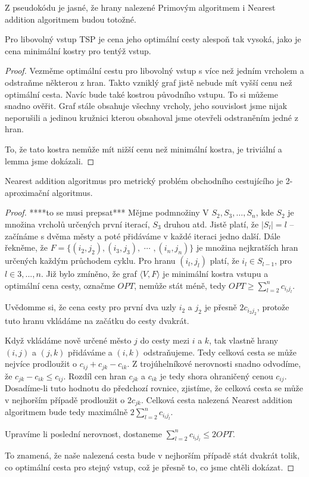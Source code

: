 \documentclass[
  biblatex,
  figures=false,
  glossaries,
  index
]{kidiplom}
\begin{document}
Z pseudokódu je jasné, že hrany nalezené Primovým algoritmem i Nearest addition algoritmem budou totožné.

\begin{lemma}\label{lemma:MSP}
Pro libovolný vstup TSP je cena jeho optimální cesty alespoň tak vysoká, jako je cena minimální kostry pro tentýž vstup.
\end{lemma}

\begin{proof}
Vezměme optimální cestu pro libovolný vstup s více než jedním vrcholem a odstraňme některou z hran. Takto vzniklý graf jistě nebude mít vyšší cenu než optimální cesta. Navíc bude také kostrou původního vstupu. To si můžeme snadno ověřit. Graf stále obsahuje všechny vrcholy, jeho souvislost jsme nijak neporušili a jedinou kružnici kterou obsahoval jsme otevřeli odstraněním jedné z hran. 

	To, že tato kostra nemůže mít nižší cenu než minimální kostra, je triviální a lemma jsme dokázali.
\end{proof}

\begin{theorem}
Nearest addition algoritmus pro metrický problém obchodního cestujícího je 2-aproximační algoritmus.
\end{theorem}

\begin{proof}
****to se musi prepsat***
Mějme podmnožiny V $S_2, S_3,…,S_n$, kde $S_2$  je množina vrcholů určených první iterací, $S_3$ druhou atd. Jistě platí, že $|S_l| = l$ – začínáme s dvěma městy a poté přidáváme v každé iteraci jedno další. Dále řekněme, že $F = \{(i_2, j_2), (i_3, j_3), $ $\cdots$ $,(i_n, j_n)\}$ je množina nejkratších hran určených každým průchodem cyklu. Pro hranu $(i_l, j_l)$ platí, že $i_l \in S_{l - 1}$, pro $l \in {3,..., n}$. Již bylo zmíněno, že graf $\langle V, F \rangle$ je minimální kostra vstupu a optimální cena cesty, označme $OPT$, nemůže stát méně, tedy $OPT \ge \sum_{l = 2}^{n} c_{i_l j_l} $.

	Uvědomme si, že cena cesty pro první dva uzly $i_2$ a $j_2$ je přesně $2c_{i_2 j_2}$, protože tuto hranu vkládáme na začátku do cesty dvakrát.
		
	Když vkládáme nově určené město $j$ do cesty mezi $i$ a $k$, tak vlastně hrany $(i, j)$ a $(j, k)$ přidáváme a $(i, k)$ odstraňujeme. Tedy celková cesta se může nejvíce prodloužit o $c_{ij} + c_{jk} - c_{ik}$. Z trojúhelníkové nerovnosti snadno odvodíme, že $c_{jk} - c_{ik} \le c_{ij}$. Rozdíl cen hran $c_{jk}$ a $c_{ik}$ je tedy shora ohraničený cenou $c_{ij}$. Dosadíme-li tuto hodnotu do předchozí rovnice,  zjistíme, že celková cesta se může v nejhorším případě prodloužit o $2c_{jk}$. Celková cesta nalezená Nearest addition algoritmem bude tedy maximálně $2\sum_{l=2}^{n}c_{i_l j_l}$.
		
	Upravíme li poslední nerovnost, dostaneme $\sum_{l=2}^{n}c_{i_l j_l} \le 2OPT$.

To znamená, že naše nalezená cesta bude v nejhorším případě stát dvakrát tolik, co optimální cesta pro stejný vstup, což je přesně to, co jsme chtěli dokázat.
\end{proof}
\end{document}
